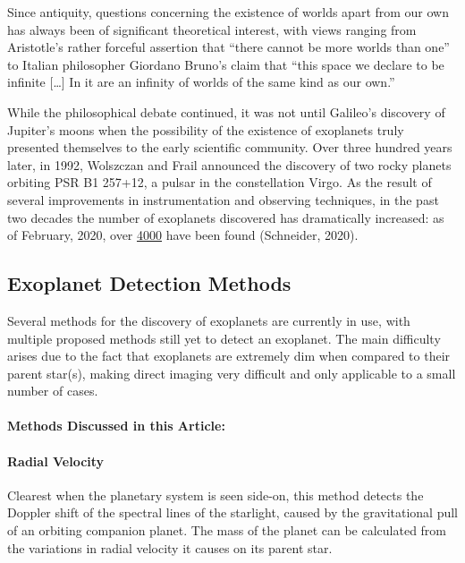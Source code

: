 \documentclass[11pt]{article}
\begin{document}
Since antiquity, questions concerning the existence of worlds apart
from our own has always been of significant theoretical interest, with
views ranging from Aristotle's rather forceful assertion that ``there cannot be more worlds than one'' to Italian philosopher Giordano Bruno's claim that
``this space we declare to be infinite {[}\ldots{]} In it are an
infinity of worlds of the same kind as our own.''

While the philosophical debate continued, it was not until Galileo's
discovery of Jupiter's moons when the possibility of the existence of
exoplanets truly presented themselves to the early scientific community.
Over three hundred years later, in 1992, Wolszczan and Frail announced
the discovery of two rocky planets orbiting PSR B1 257+12, a pulsar in
the constellation Virgo. As the result of several improvements in
instrumentation and observing techniques, in the past two decades the
number of exoplanets discovered has dramatically increased: as of
February, 2020, over \href{http://exoplanet.eu/catalog/}{4000} have been
found (Schneider, 2020).

    \hypertarget{exoplanet-detection-methods}{%
\subsection{Exoplanet Detection Methods}\label{exoplanet-detection-methods}}

Several methods for the discovery of exoplanets are currently in use,
with multiple proposed methods still yet to detect an exoplanet. The
main difficulty arises due to the fact that exoplanets are extremely dim
when compared to their parent star(s), making direct imaging very difficult
and only applicable to a small number of cases.

\hypertarget{methods-discussed-in-this-article}{%
\paragraph{Methods Discussed in this Article:}\label{methods-discussed-in-this-article}}

\hypertarget{radial-velocity}{%
\paragraph{Radial Velocity}\label{radial-velocity}}

Clearest when the planetary system is seen side-on, this method detects
the Doppler shift of the spectral lines of the starlight, caused by the
gravitational pull of an orbiting companion planet. The mass of the
planet can be calculated from the variations in radial velocity it
causes on its parent star.
\end{document}
